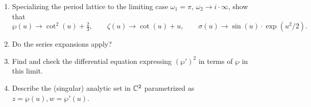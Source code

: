 \documentclass[12pt]{article}  %
\begin{document}
\begin{problem}[5]
\begin{enumerate}
  \item Specializing the period lattice to the limiting case $\omega_1 = \pi$, $\omega_2 \to i\cdot\infty$, show that
  \[
    \wp(u) \to \cot^2(u) + \tfrac{2}{3}, \qquad
    \zeta(u) \to \cot(u)+u, \qquad
    \sigma(u) \to \sin(u)\cdot \exp(u^2/2).
  \]
  \item Do the series expansions apply?
  \item Find and check the differential equation expressing $(\wp')^2$ in terms of $\wp$ in this limit.
  \item Describe the (singular) analytic set in $\mathbb{C}^2$ parametrized as $z=\wp(u), w=\wp'(u)$.
\end{enumerate}
\end{problem}
\end{document}
